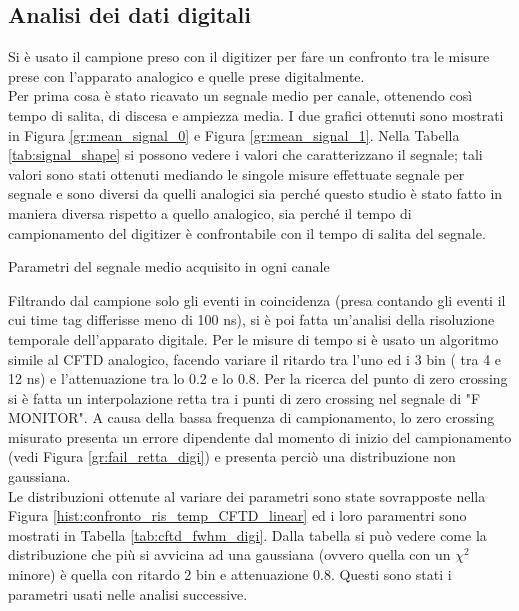 \subsection{Analisi dei dati digitali}
Si è usato il campione preso con il digitizer per fare un confronto tra le misure prese con l'apparato analogico e quelle prese digitalmente.\\
Per prima cosa è stato ricavato un segnale medio per canale, ottenendo così tempo di salita, di discesa e ampiezza media. I due grafici ottenuti sono mostrati in Figura \ref{gr:mean_signal_0} e Figura \ref{gr:mean_signal_1}. Nella Tabella \ref{tab:signal_shape} si possono vedere i valori che caratterizzano il segnale; tali
valori sono stati ottenuti mediando le singole misure effettuate segnale per segnale e sono diversi da quelli analogici sia perché questo studio è stato fatto in maniera
diversa rispetto a quello analogico, sia perché il tempo di campionamento del digitizer è confrontabile con il tempo di salita del segnale.\\




\begin{table}[h]
	\centering
	
	\caption{Parametri del segnale medio acquisito in ogni canale}
	\label{tab:signal_shape}
\end{table}

Filtrando dal campione solo gli eventi in coincidenza (presa contando gli eventi il cui time tag differisse meno di 100 ns), si è poi fatta un'analisi della risoluzione temporale dell'apparato digitale. Per le misure di tempo si è usato un algoritmo simile al CFTD analogico, facendo variare il ritardo tra l'uno ed i 3 bin ( tra 4 e 12 ns) e l'attenuazione tra lo 0.2 e lo 0.8. Per la ricerca del punto di zero crossing si è fatta un interpolazione retta tra i punti di zero crossing nel segnale di "F MONITOR". A causa della bassa frequenza di campionamento, lo zero crossing misurato presenta un errore dipendente dal momento di inizio del campionamento (vedi Figura \ref{gr:fail_retta_digi}) e presenta perciò una distribuzione non gaussiana.\\



Le distribuzioni ottenute al variare dei parametri sono state sovrapposte nella Figura \ref{hist:confronto_ris_temp_CFTD_linear} ed i loro paramentri sono mostrati in Tabella \ref{tab:cftd_fwhm_digi}. Dalla tabella si può vedere come la distribuzione che più si avvicina ad una gaussiana (ovvero quella con un $\chi^2$ minore) è quella con ritardo 2 bin e attenuazione 0.8. Questi sono stati i parametri usati nelle analisi successive.\\

